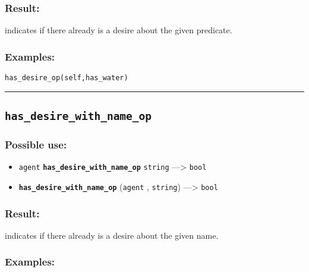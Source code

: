 \documentclass[]{book}
\providecommand{\tightlist}{%
  \setlength{\itemsep}{0pt}\setlength{\parskip}{0pt}}
\theoremstyle{definition}
\theoremstyle{definition}
\theoremstyle{definition}
\theoremstyle{remark}
\begin{document}
\subsubsection{Result:}\label{result-239}

indicates if there already is a desire about the given predicate.

\subsubsection{Examples:}\label{examples-188}

\begin{verbatim}
has_desire_op(self,has_water) 
\end{verbatim}

\begin{center}\rule{0.5\linewidth}{\linethickness}\end{center}

\subsection{\texorpdfstring{\texttt{has\_desire\_with\_name\_op}}{has\_desire\_with\_name\_op}}\label{has_desire_with_name_op}

\subsubsection{Possible use:}\label{possible-use-249}

\begin{itemize}
\tightlist
\item
  \texttt{agent} \textbf{\texttt{has\_desire\_with\_name\_op}}
  \texttt{string} ---\textgreater{} \texttt{bool}
\item
  \textbf{\texttt{has\_desire\_with\_name\_op}} (\texttt{agent} ,
  \texttt{string}) ---\textgreater{} \texttt{bool}
\end{itemize}

\subsubsection{Result:}\label{result-240}

indicates if there already is a desire about the given name.

\subsubsection{Examples:}\label{examples-189}
\end{document}
